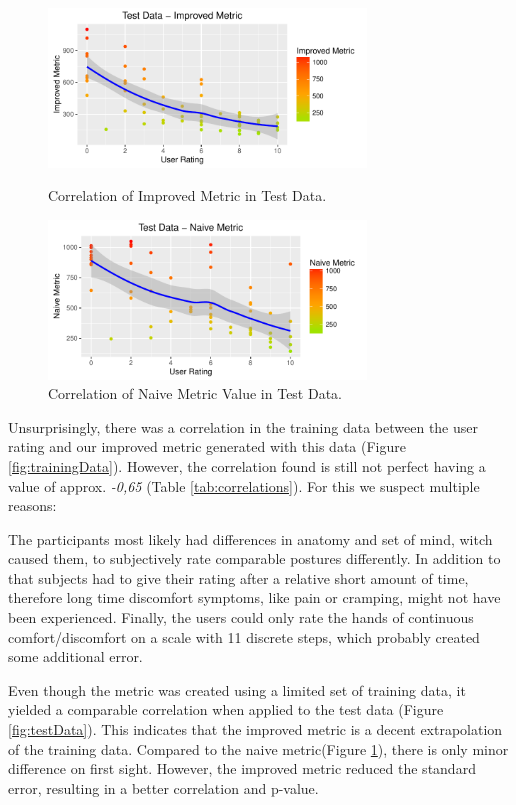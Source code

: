 \documentclass{sig-alternate-05-2015}
\begin{document}
\begin{figure}[t]
\centering
\includegraphics[width=8.45cm]{TestDataImproved}
\vspace{-20pt}
\caption{Correlation of Improved Metric in Test Data.}
\vspace{-10pt}
\label{fig:testData}

\includegraphics[width=8.45cm]{TestDataNaive}
\vspace{-20pt}
\caption{Correlation of Naive Metric Value in Test Data.}
\label{fig:testDataNaive}
\vspace{-20pt}
\end{figure}


Unsurprisingly, there was a correlation in the training data between the user rating and our improved metric generated with this data (Figure \ref{fig:trainingData}). However, the correlation found is still not perfect having a value of approx. \textsl{-0,65} (Table \ref{tab:correlations}). For this we suspect multiple reasons: 

The participants most likely had differences in anatomy and set of mind, witch caused them, to subjectively rate comparable postures differently. In addition to that subjects had to give their rating after a relative short amount of time, therefore long time discomfort symptoms, like pain or cramping, might not have been experienced. Finally, the users could only rate the hands of continuous comfort/discomfort on a scale with 11 discrete steps, which probably created some additional error.

Even though the metric was created using a limited set of training data, it yielded a comparable correlation when applied to the test data (Figure \ref{fig:testData}). This indicates that the improved metric is a decent extrapolation of the training data. Compared to the naive metric(Figure \ref{fig:testDataNaive}), there is only minor difference on first sight. However, the improved metric reduced the standard error, resulting in a better correlation and p-value.
\end{document}

